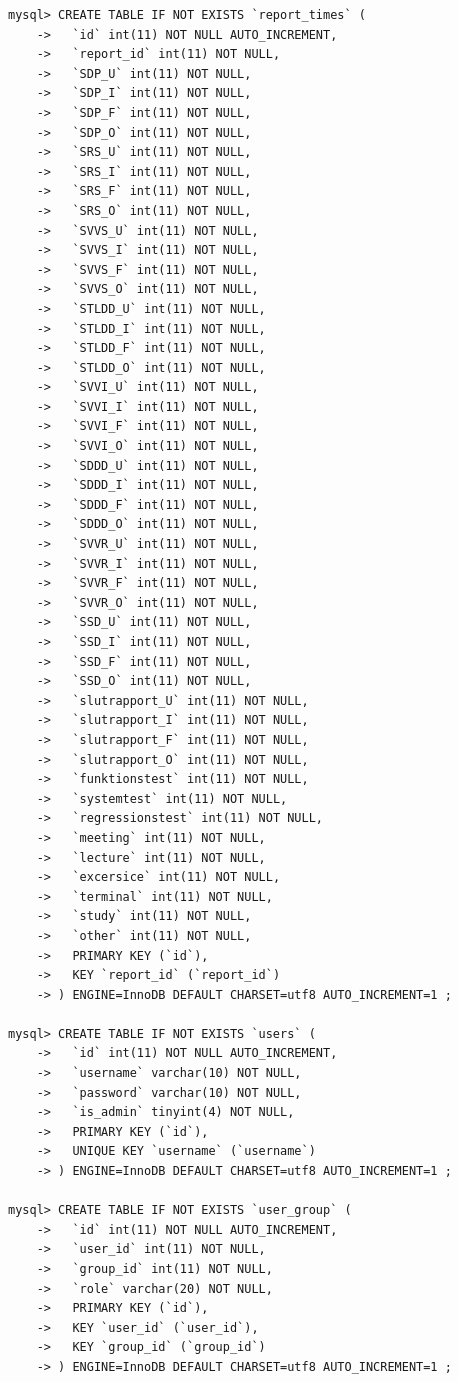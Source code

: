\documentclass[a4paper]{article}
\begin{document}
\begin{lstlisting}
mysql> CREATE TABLE IF NOT EXISTS `report_times` (
    ->   `id` int(11) NOT NULL AUTO_INCREMENT,
    ->   `report_id` int(11) NOT NULL,
    ->   `SDP_U` int(11) NOT NULL,
    ->   `SDP_I` int(11) NOT NULL,
    ->   `SDP_F` int(11) NOT NULL,
    ->   `SDP_O` int(11) NOT NULL,
    ->   `SRS_U` int(11) NOT NULL,
    ->   `SRS_I` int(11) NOT NULL,
    ->   `SRS_F` int(11) NOT NULL,
    ->   `SRS_O` int(11) NOT NULL,
    ->   `SVVS_U` int(11) NOT NULL,
    ->   `SVVS_I` int(11) NOT NULL,
    ->   `SVVS_F` int(11) NOT NULL,
    ->   `SVVS_O` int(11) NOT NULL,
    ->   `STLDD_U` int(11) NOT NULL,
    ->   `STLDD_I` int(11) NOT NULL,
    ->   `STLDD_F` int(11) NOT NULL,
    ->   `STLDD_O` int(11) NOT NULL,
    ->   `SVVI_U` int(11) NOT NULL,
    ->   `SVVI_I` int(11) NOT NULL,
    ->   `SVVI_F` int(11) NOT NULL,
    ->   `SVVI_O` int(11) NOT NULL,
    ->   `SDDD_U` int(11) NOT NULL,
    ->   `SDDD_I` int(11) NOT NULL,
    ->   `SDDD_F` int(11) NOT NULL,
    ->   `SDDD_O` int(11) NOT NULL,
    ->   `SVVR_U` int(11) NOT NULL,
    ->   `SVVR_I` int(11) NOT NULL,
    ->   `SVVR_F` int(11) NOT NULL,
    ->   `SVVR_O` int(11) NOT NULL,
    ->   `SSD_U` int(11) NOT NULL,
    ->   `SSD_I` int(11) NOT NULL,
    ->   `SSD_F` int(11) NOT NULL,
    ->   `SSD_O` int(11) NOT NULL,
    ->   `slutrapport_U` int(11) NOT NULL,
    ->   `slutrapport_I` int(11) NOT NULL,
    ->   `slutrapport_F` int(11) NOT NULL,
    ->   `slutrapport_O` int(11) NOT NULL,
    ->   `funktionstest` int(11) NOT NULL,
    ->   `systemtest` int(11) NOT NULL,
    ->   `regressionstest` int(11) NOT NULL,
    ->   `meeting` int(11) NOT NULL,
    ->   `lecture` int(11) NOT NULL,
    ->   `excersice` int(11) NOT NULL,
    ->   `terminal` int(11) NOT NULL,
    ->   `study` int(11) NOT NULL,
    ->   `other` int(11) NOT NULL,
    ->   PRIMARY KEY (`id`),
    ->   KEY `report_id` (`report_id`)
    -> ) ENGINE=InnoDB DEFAULT CHARSET=utf8 AUTO_INCREMENT=1 ;

mysql> CREATE TABLE IF NOT EXISTS `users` (
    ->   `id` int(11) NOT NULL AUTO_INCREMENT,
    ->   `username` varchar(10) NOT NULL,
    ->   `password` varchar(10) NOT NULL,
    ->   `is_admin` tinyint(4) NOT NULL,
    ->   PRIMARY KEY (`id`),
    ->   UNIQUE KEY `username` (`username`)
    -> ) ENGINE=InnoDB DEFAULT CHARSET=utf8 AUTO_INCREMENT=1 ;
    
mysql> CREATE TABLE IF NOT EXISTS `user_group` (
    ->   `id` int(11) NOT NULL AUTO_INCREMENT,
    ->   `user_id` int(11) NOT NULL,
    ->   `group_id` int(11) NOT NULL,
    ->   `role` varchar(20) NOT NULL,
    ->   PRIMARY KEY (`id`),
    ->   KEY `user_id` (`user_id`),
    ->   KEY `group_id` (`group_id`)
    -> ) ENGINE=InnoDB DEFAULT CHARSET=utf8 AUTO_INCREMENT=1 ;
    

\end{lstlisting}
\end{document}
